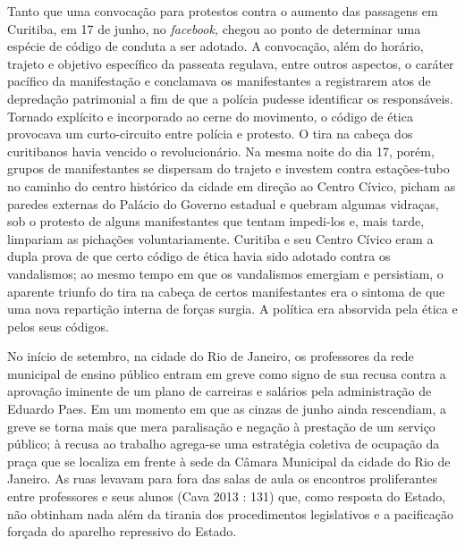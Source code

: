 Tanto que uma convocação para protestos contra o aumento das passagens
em Curitiba, em 17 de junho, no \emph{facebook,} chegou ao ponto de
determinar uma espécie de código de conduta a ser adotado. A convocação,
além do horário, trajeto e objetivo específico da passeata regulava,
entre outros aspectos, o caráter pacífico da manifestação e conclamava
os manifestantes a registrarem atos de depredação patrimonial a fim de
que a polícia pudesse identificar os responsáveis. Tornado explícito e
incorporado ao cerne do movimento, o código de ética provocava um
curto-circuito entre polícia e protesto. O tira na cabeça dos
curitibanos havia vencido o revolucionário. Na mesma noite do dia 17,
porém, grupos de manifestantes se dispersam do trajeto e investem contra
estações-tubo no caminho do centro histórico da cidade em direção ao
Centro Cívico, picham as paredes externas do Palácio do Governo estadual
e quebram algumas vidraças, sob o protesto de alguns manifestantes que
tentam impedi-los e, mais tarde, limpariam as pichações voluntariamente.
Curitiba e seu Centro Cívico eram a dupla prova de que certo código de
ética havia sido adotado contra os vandalismos; ao mesmo tempo em que os
vandalismos emergiam e persistiam, o aparente triunfo do tira na cabeça
de certos manifestantes era o sintoma de que uma nova repartição interna
de forças surgia. A política era absorvida pela ética e pelos seus
códigos.

No início de setembro, na cidade do Rio de Janeiro, os professores da
rede municipal de ensino público entram em greve como signo de sua
recusa contra a aprovação iminente de um plano de carreiras e salários
pela administração de Eduardo Paes. Em um momento em que as cinzas de
junho ainda rescendiam, a greve se torna mais que mera paralisação e
negação à prestação de um serviço público; à recusa ao trabalho
agrega-se uma estratégia coletiva de ocupação da praça que se localiza
em frente à sede da Câmara Municipal da cidade do Rio de Janeiro. As
ruas levavam para fora das salas de aula os encontros proliferantes
entre professores e seus alunos (Cava 2013 : 131) que, como resposta do
Estado, não obtinham nada além da tirania dos procedimentos legislativos
e a pacificação forçada do aparelho repressivo do Estado.

